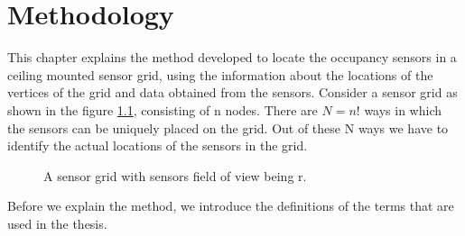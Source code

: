 \chapter{Methodology}

This chapter explains the method developed to locate the occupancy sensors in a ceiling mounted sensor grid, using the information about the locations of the vertices of the grid and data obtained from the sensors.
Consider a sensor grid as shown in the figure \ref{fig:Grid}, consisting of n nodes. There are $N= n!$ ways in which the sensors can be uniquely placed on the grid. 
Out of these N ways we have to identify the actual locations of the sensors in the grid.
\begin{figure}[!ht]
\centering
\caption{A sensor grid with sensors field of view being r.}
\label{fig:Grid}
\end{figure}
Before we explain the method, we introduce the definitions of the terms that are used in the thesis.
